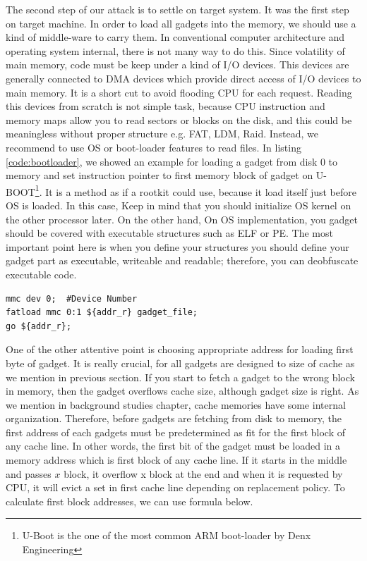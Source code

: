  	    	The second step of our attack is to settle on target system. It was the first step on target machine. In order to load all gadgets into the memory, we should use a kind of middle-ware to carry them. In conventional computer architecture and operating system internal, there is not many way to do this. Since volatility of main memory, code must be keep under a kind of I/O devices. This devices are generally connected to DMA devices which provide direct access of I/O devices to main memory. It is a short cut to avoid flooding CPU for each request\cite{mmap2011}. Reading this devices from scratch is not simple task, because CPU instruction and memory maps allow you to read sectors or blocks on the disk, and this could be meaningless without proper structure e.g. FAT, LDM, Raid. Instead, we recommend to use OS or boot-loader features to read files. In listing \ref{code:bootloader}, we showed an example for loading a gadget from disk 0 to memory and set instruction pointer to first memory block of gadget on U-BOOT\footnote{U-Boot is the one of the most common ARM boot-loader by Denx Engineering}. It is a method as if a rootkit could use, because it load itself just before OS is loaded. In this case, Keep in mind that you should initialize OS kernel on the other processor later. On the other hand, On OS implementation, you gadget should be covered with executable structures such as ELF or PE. The most important point here is when you define your structures you should define your gadget part as executable, writeable and readable; therefore, you can deobfuscate executable code.

 	    	\begin{lstlisting}[caption=The code example for loading a gadget from disk to memory and run it on U-Boot, label=code:bootloader]
mmc dev 0; 	#Device Number
fatload mmc 0:1 ${addr_r} gadget_file;
go ${addr_r};
 	    	\end{lstlisting}

 	    	One of the other attentive point is choosing appropriate address for loading first byte of gadget. It is really crucial, for all gadgets are designed to size of cache as we mention in previous section. If you start to fetch a gadget to the wrong block in memory, then the gadget overflows cache size, although gadget size is right. As we mention in background studies chapter, cache memories have some internal organization. Therefore, before gadgets are fetching from disk to memory, the first address of each gadgets must be predetermined as fit for the first block of any cache line. In other words, the first bit of the gadget must be loaded in a memory address which is first block of any cache line. If it starts in the middle and passes $x$ block, it overflow x block at the end and when it is requested by CPU, it will evict a set in first cache line depending on replacement policy. To calculate first block addresses, we can use formula below.


